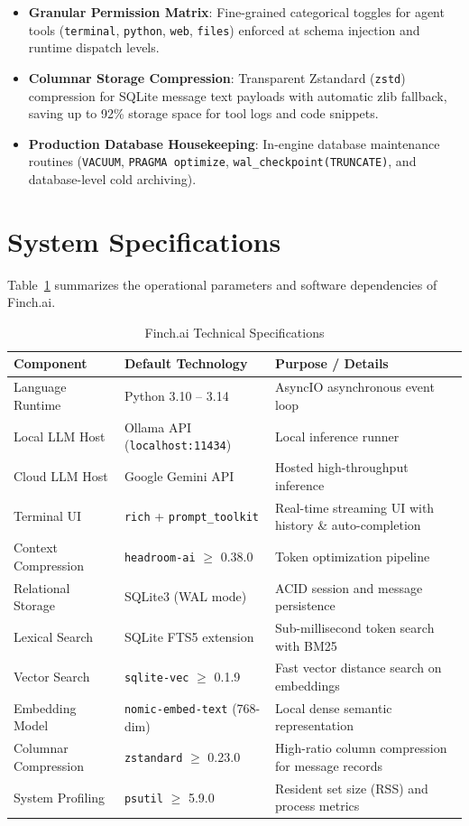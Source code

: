 \begin{itemize}
\begin{itemize}
    \end{itemize}
    \item \textbf{Granular Permission Matrix}: Fine-grained categorical toggles for agent tools (\texttt{terminal}, \texttt{python}, \texttt{web}, \texttt{files}) enforced at schema injection and runtime dispatch levels.
    \item \textbf{Columnar Storage Compression}: Transparent Zstandard (\texttt{zstd}) compression for SQLite message text payloads with automatic zlib fallback, saving up to 92\% storage space for tool logs and code snippets.
    \item \textbf{Production Database Housekeeping}: In-engine database maintenance routines (\texttt{VACUUM}, \texttt{PRAGMA optimize}, \texttt{wal\_checkpoint(TRUNCATE)}, and database-level cold archiving).
\end{itemize}

\section{System Specifications}
Table~\ref{tab:system_specs} summarizes the operational parameters and software dependencies of Finch.ai.

\begin{table}[h!]
\centering
\small
\begin{tabular}{llp{7.5cm}}
\toprule
\textbf{Component} & \textbf{Default Technology} & \textbf{Purpose / Details} \\
\midrule
Language Runtime & Python 3.10 -- 3.14 & AsyncIO asynchronous event loop \\
Local LLM Host & Ollama API (\texttt{localhost:11434}) & Local inference runner \\
Cloud LLM Host & Google Gemini API & Hosted high-throughput inference \\
Terminal UI & \texttt{rich} + \texttt{prompt\_toolkit} & Real-time streaming UI with history \& auto-completion \\
Context Compression & \texttt{headroom-ai} $\ge$ 0.38.0 & Token optimization pipeline \\
Relational Storage & SQLite3 (WAL mode) & ACID session and message persistence \\
Lexical Search & SQLite FTS5 extension & Sub-millisecond token search with BM25 \\
Vector Search & \texttt{sqlite-vec} $\ge$ 0.1.9 & Fast vector distance search on embeddings \\
Embedding Model & \texttt{nomic-embed-text} (768-dim) & Local dense semantic representation \\
Columnar Compression & \texttt{zstandard} $\ge$ 0.23.0 & High-ratio column compression for message records \\
System Profiling & \texttt{psutil} $\ge$ 5.9.0 & Resident set size (RSS) and process metrics \\
\bottomrule
\end{tabular}
\caption{Finch.ai Technical Specifications}
\label{tab:system_specs}
\end{table}
